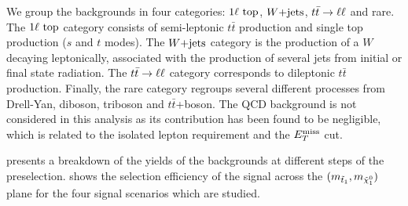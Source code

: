         We group the backgrounds in four categories: $1\ell~\text{top}$, $\text{$W$+jets}$, $t\bar{t} \rightarrow \ell \ell$
        and rare. The $1\ell~\text{top}$ category consists of semi-leptonic $t\bar{t}$
        production and single top production ($s$ and $t$ modes). The $\text{$W$+jets}$
        category is the production of a $W$ decaying leptonically, associated with the
        production of several jets from initial or final state radiation. The $t\bar{t} \rightarrow \ell \ell$
        category corresponds to dileptonic $t\bar{t}$ production. Finally, the rare
        category regroups several different processes from Drell-Yan, diboson, triboson and
        $t\bar{t}$+boson. The QCD background is not considered in this analysis as its
        contribution has been found to be negligible, which is related to the
        isolated lepton requirement and the $E_T^\text{miss}$ cut.

         presents a breakdown of the yields of the backgrounds
        at different steps of the preselection.  shows
        the selection efficiency of the signal across the $(m_{\tilde{t}_1}, m_{\tilde{\chi}_1^0})$
        plane for the four signal scenarios which are studied.

